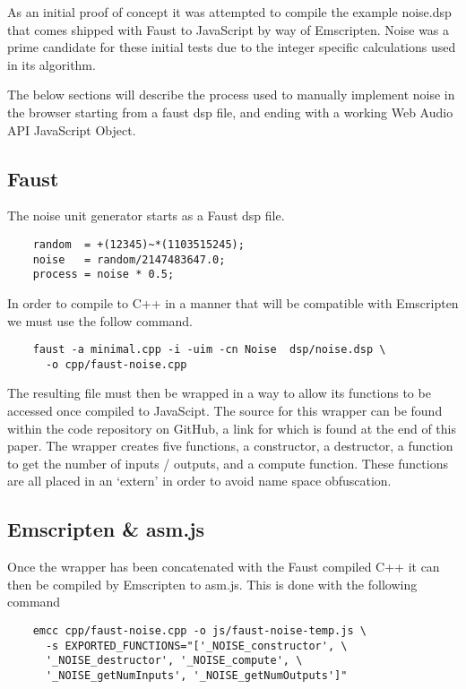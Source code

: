\documentclass[runningheads,a4paper]{llncs}
\begin{document}
As an initial proof of concept it was attempted to compile the example noise.dsp that comes shipped with Faust to JavaScript by way of Emscripten. Noise was a prime candidate for these initial tests due to the integer specific calculations used in its algorithm.

The below sections will describe the process used to manually implement noise in the browser starting from a faust dsp file, and ending with a working Web Audio API JavaScript Object.

\subsection{Faust}

The noise unit generator starts as a Faust dsp file.

\begin{verbatim}
    random  = +(12345)~*(1103515245);
    noise   = random/2147483647.0;
    process = noise * 0.5;
\end{verbatim}

In order to compile to C++ in a manner that will be compatible with Emscripten we must use the follow command.

\begin{verbatim}
    faust -a minimal.cpp -i -uim -cn Noise  dsp/noise.dsp \
      -o cpp/faust-noise.cpp
\end{verbatim}

The resulting file must then be wrapped in a way to allow its functions to be accessed once compiled to JavaScipt. The source for this wrapper can be found within the code repository on GitHub, a link for which is found at the end of this paper.  The wrapper creates five functions, a constructor, a destructor, a function to get the number of inputs / outputs, and a compute function. These functions are all placed in an `extern' in order to avoid name space obfuscation.
\subsection{Emscripten \& asm.js}

Once the wrapper has been concatenated with the Faust compiled C++ it can then be compiled by Emscripten to asm.js.  This is done with the following command 

\begin{verbatim}
    emcc cpp/faust-noise.cpp -o js/faust-noise-temp.js \
      -s EXPORTED_FUNCTIONS="['_NOISE_constructor', \ 
      '_NOISE_destructor', '_NOISE_compute', \
      '_NOISE_getNumInputs', '_NOISE_getNumOutputs']"
\end{verbatim}
\end{document}
